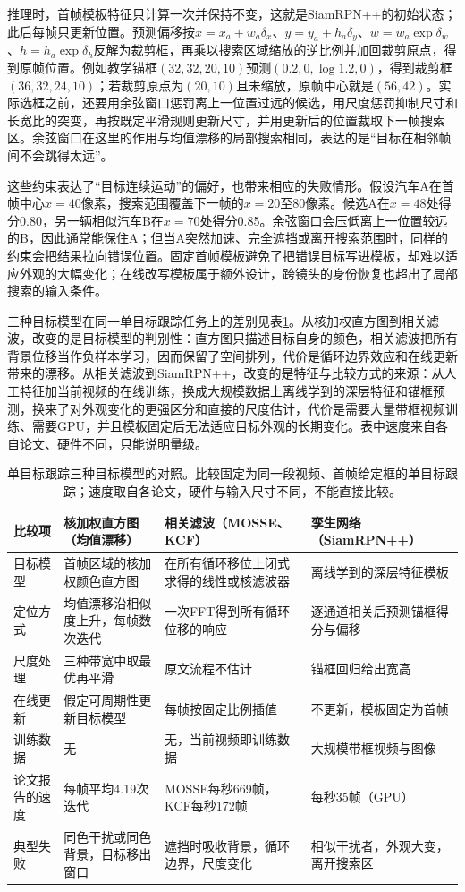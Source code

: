 推理时，首帧模板特征只计算一次并保持不变，这就是SiamRPN++的初始状态；此后每帧只更新位置。预测偏移按$x=x_a+w_a\delta_x$、$y=y_a+h_a\delta_y$、$w=w_a\exp\delta_w$、$h=h_a\exp\delta_h$反解为裁剪框，再乘以搜索区域缩放的逆比例并加回裁剪原点，得到原帧位置。例如教学锚框$(32,32,20,10)$预测$(0.2,0,\log1.2,0)$，得到裁剪框$(36,32,24,10)$；若裁剪原点为$(20,10)$且未缩放，原帧中心就是$(56,42)$。实际选框之前，还要用余弦窗口惩罚离上一位置过远的候选，用尺度惩罚抑制尺寸和长宽比的突变，再按既定平滑规则更新尺寸，并用更新后的位置裁取下一帧搜索区。余弦窗口在这里的作用与均值漂移的局部搜索相同，表达的是“目标在相邻帧间不会跳得太远”。

这些约束表达了“目标连续运动”的偏好，也带来相应的失败情形。假设汽车A在首帧中心$x=40$像素，搜索范围覆盖下一帧的$x=20$至80像素。候选A在$x=48$处得分0.80，另一辆相似汽车B在$x=70$处得分0.85。余弦窗口会压低离上一位置较远的B，因此通常能保住A；但当A突然加速、完全遮挡或离开搜索范围时，同样的约束会把结果拉向错误位置。固定首帧模板避免了把错误目标写进模板，却难以适应外观的大幅变化；在线改写模板属于额外设计，跨镜头的身份恢复也超出了局部搜索的输入条件。

三种目标模型在同一单目标跟踪任务上的差别见表\ref{tab:vision-video-sot-compare}。从核加权直方图到相关滤波，改变的是目标模型的判别性：直方图只描述目标自身的颜色，相关滤波把所有背景位移当作负样本学习，因而保留了空间排列，代价是循环边界效应和在线更新带来的漂移。从相关滤波到SiamRPN++，改变的是特征与比较方式的来源：从人工特征加当前视频的在线训练，换成大规模数据上离线学到的深层特征和锚框预测，换来了对外观变化的更强区分和直接的尺度估计，代价是需要大量带框视频训练、需要GPU，并且模板固定后无法适应目标外观的长期变化。表中速度来自各自论文、硬件不同，只能说明量级。

\begin{table}[tbp]
  \centering
  \small
  \begin{tabularx}{\linewidth}{@{}lXXX@{}}
    \toprule
    比较项 & 核加权直方图（均值漂移） & 相关滤波（MOSSE、KCF） & 孪生网络（SiamRPN++）\\
    \midrule
    目标模型 & 首帧区域的核加权颜色直方图 & 在所有循环移位上闭式求得的线性或核滤波器 & 离线学到的深层特征模板\\
    定位方式 & 均值漂移沿相似度上升，每帧数次迭代 & 一次FFT得到所有循环位移的响应 & 逐通道相关后预测锚框得分与偏移\\
    尺度处理 & 三种带宽中取最优再平滑 & 原文流程不估计 & 锚框回归给出宽高\\
    在线更新 & 假定可周期性更新目标模型 & 每帧按固定比例插值 & 不更新，模板固定为首帧\\
    训练数据 & 无 & 无，当前视频即训练数据 & 大规模带框视频与图像\\
    论文报告的速度 & 每帧平均4.19次迭代 & MOSSE每秒669帧，KCF每秒172帧 & 每秒35帧（GPU）\\
    典型失败 & 同色干扰或同色背景，目标移出窗口 & 遮挡时吸收背景，循环边界，尺度变化 & 相似干扰者，外观大变，离开搜索区\\
    \bottomrule
  \end{tabularx}
  \caption{单目标跟踪三种目标模型的对照。比较固定为同一段视频、首帧给定框的单目标跟踪；速度取自各论文，硬件与输入尺寸不同，不能直接比较。}
  \label{tab:vision-video-sot-compare}
\end{table}


